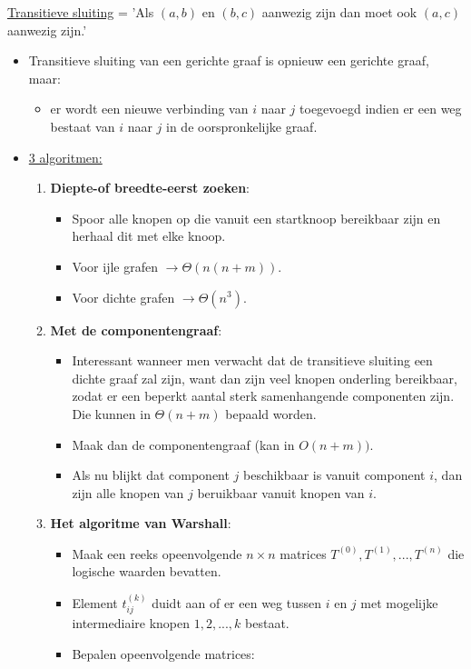 \underline{Transitieve sluiting} = 'Als $(a, b)$ en $(b, c)$ aanwezig zijn dan moet ook $(a, c)$ aanwezig zijn.'

\begin{itemize}
	\item Transitieve sluiting van een gerichte graaf is opnieuw een gerichte graaf, maar:
	\begin{itemize}
		\item er wordt een nieuwe verbinding van $i$ naar $j$ toegevoegd indien er een weg bestaat van $i$ naar $j$ in de oorspronkelijke graaf.
	\end{itemize}
	\item \underline{3 algoritmen:}
	\begin{enumerate}
		\item \textbf{Diepte-of breedte-eerst zoeken}: 
				\begin{itemize}
					\item Spoor alle knopen op die vanuit een startknoop bereikbaar zijn en herhaal dit met elke knoop.
					\item Voor ijle grafen $\rightarrow \Theta(n(n + m))$.
					\item Voor dichte grafen $\rightarrow \Theta(n^3)$.
				\end{itemize}
		\item \textbf{Met de componentengraaf}:
				\begin{itemize}
					\item Interessant wanneer men verwacht dat de transitieve sluiting een dichte graaf zal zijn, want dan zijn veel knopen onderling bereikbaar, zodat er een beperkt aantal sterk samenhangende componenten zijn. Die kunnen in $\Theta(n + m)$ bepaald worden.
					\item Maak dan de componentengraaf (kan in $O(n + m))$.
					\item Als nu blijkt dat component $j$ beschikbaar is vanuit component $i$, dan zijn alle knopen van $j$ beruikbaar vanuit knopen van $i$.
				\end{itemize}
		\item \textbf{Het algoritme van Warshall}:
				\begin{itemize}
					\item Maak een reeks opeenvolgende $n \times n$ matrices $T^{(0)},T^{(1)},...,T^{(n)}$ die logische waarden bevatten.
					\item Element $t_{ij}^{(k)}$ duidt aan of er een weg tussen $i$ en $j$ met mogelijke intermediaire knopen $1, 2, ..., k$ bestaat.
					\item Bepalen opeenvolgende matrices:

\end{itemize}
\end{enumerate}
\end{itemize}
